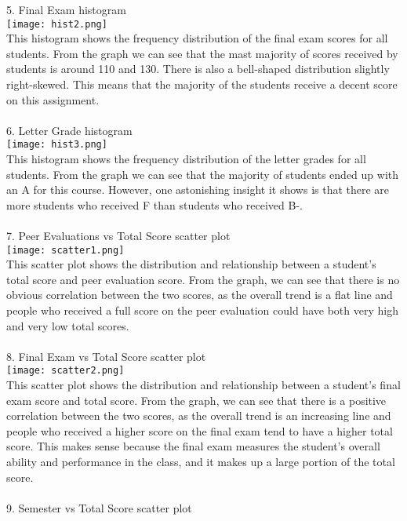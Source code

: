 \documentclass[9pt,twoside]{exam}
\begin{document}
5. Final Exam histogram \\
\texttt{[image: hist2.png]}\\
This histogram shows the frequency distribution of the final exam scores for all students. From the graph we can see that the mast majority of scores received by students is around 110 and 130. There is also a bell-shaped distribution slightly right-skewed. This means that the majority of the students receive a decent score on this assignment.\\\\
6. Letter Grade histogram \\
\texttt{[image: hist3.png]}\\
This histogram shows the frequency distribution of the letter grades for all students. From the graph we can see that the majority of students ended up with an A for this course. However, one astonishing insight it shows is that there are more students who received F than students who received B-.\\\\
7. Peer Evaluations vs Total Score scatter plot \\
\texttt{[image: scatter1.png]}\\
This scatter plot shows the distribution and relationship between a student's total score and peer evaluation score. From the graph, we can see that there is no obvious correlation between the two scores, as the overall trend is a flat line and people who received a full score on the peer evaluation could have both very high and very low total scores. \\\\
8. Final Exam vs Total Score scatter plot  \\
\texttt{[image: scatter2.png]}\\
This scatter plot shows the distribution and relationship between a student's final exam score and total score. From the graph, we can see that there is a positive correlation between the two scores, as the overall trend is an increasing line and people who received a higher score on the final exam tend to have a higher total score. This makes sense because the final exam measures the student's overall ability and performance in the class, and it makes up a large portion of the total score. \\\\
9. Semester vs Total Score scatter plot \\
\end{document}

